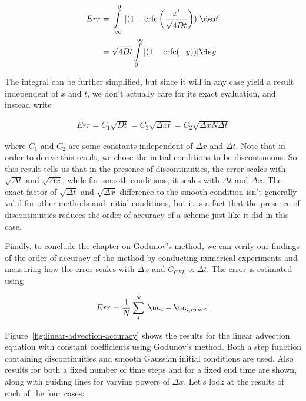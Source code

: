 \begin{align}
    Err &= \int\limits_{-\infty}^{0}
        | (1 - \mathrm{erfc}\left(\frac{x'}{\sqrt{4 D t}} \right)) | \de x' \\
        &= \sqrt{4 D t} \int\limits^{\infty}_{0}
        | (1 - \mathrm{erfc}(-y)) | \de y
\end{align}

The integral can be further simplified, but since it will in any case yield a result independent of
$x$ and $t$, we don't actually care for its exact evaluation, and instead write

\begin{align}
    Err = C_1 \sqrt{D t} = C_2 \sqrt{\Delta x t} = C_2 \sqrt{\Delta x N \Delta t}
\label{eq:error-discontinuity}
\end{align}

where $C_1$ and $C_2$ are some constants independent of $\Delta x$ and $\Delta t$. Note that in
order to derive this result, we chose the initial conditions to be discontinuous. So this
result tells us that in the presence of discontinuities, the error scales with $\sqrt{\Delta t}$ and
$\sqrt{\Delta x}$, while for smooth conditions, it scales with $\Delta t$ and $\Delta x$. The exact
factor of $\sqrt{\Delta t}$ and $\sqrt{\Delta x}$ difference to the smooth condition isn't
generally valid for other methods and initial conditions, but it is a fact that the presence of
discontinuities reduces the order of accuracy of a scheme just like it did in this case.


Finally, to conclude the chapter on Godunov's method, we can verify our findings of the order of
accuracy of the method by conducting numerical experiments and measuring how the error scales with
$\Delta x$ and $C_{CFL} \propto \Delta t$. The error is estimated using

\begin{align}
    Err = \frac{1}{N} \sum_i^N |\uc_i - \uc_{i,exact}|
\end{align}


Figure~\ref{fig:linear-advection-accuracy} shows the results for the linear advection equation with
constant coefficients using Godunov's method. Both a step function containing discontinuities and
smooth Gaussian initial conditions are used. Also results for both a fixed number of time steps and
for a fixed end time are shown, along with guiding lines for varying powers of $\Delta x$. Let's
look at the results of each of the four cases:

